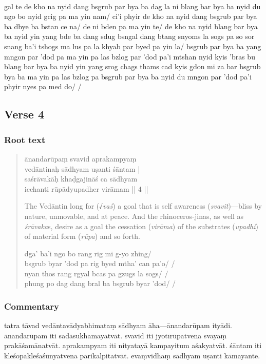 \documentclass[12pt]{article}
\newcommand{\emdash} {\hspace{0em}—\hspace{0em}}
\begin{document}
\textbf{\TVB}\\
gal te de kho na nyid dang bsgrub par bya ba dag la ni blang bar bya ba nyid du ngo bo nyid gcig pa ma yin nam/ ci'i phyir de kho na nyid dang bsgrub par bya ba dbye ba bstan ce na/ de ni bden pa ma yin te/ de kho na nyid blang bar bya ba nyid yin yang bde ba dang sdug bsngal dang btang snyoms la sogs pa so sor snang ba'i tshogs ma lus pa la khyab par byed pa yin la/ bsgrub par bya ba yang mngon par 'dod pa ma yin pa las bzlog par 'dod pa'i mtshan nyid kyis 'bras bu blang bar bya ba nyid yin yang srog chags thams cad kyis gdon mi za bar bsgrub bya ba ma yin pa las bzlog pa bsgrub par bya ba nyid du mngon par 'dod pa'i phyir nyes pa med do/ /

\subsection{Verse 4}
\subsubsection{Root text}
\begin{quote}
	ānandarūpaṃ svavid aprakampyaṃ \\
	vedāntinaḥ sādhyam uṣanti śāntam\footnoteB{
		śāntam] \corr ; sāntam \MS\ \EDD ; \emph{no reflex in} \TIB
	} |\\
	saśrāvakāḥ\footnoteB{
		saśrāvakāḥ] \emd ; saśrāvakā \MS\ \EDD
	} khaḍgajināś ca sādhyam\\
	icchanti rūpādyupadher virāmam || 4 ||

	The Vedāntin long for (√\emph{vaś}) a goal that is self awareness (\emph{svavit})\emdash bliss by nature, unmovable, and at peace. And the rhinoceros-jinas, as well as \emph{śrāvaka}s, desire as a goal the cessation (\emph{virāma}) of the substrates (\emph{upadhi}) of material form (\emph{rūpa}) and so forth.

	dga' ba'i ngo bo rang rig mi g-yo zhing/ \\
	bsgrub byar 'dod pa rig byed mtha' can pa'o/ /\\
	nyan thos rang rgyal bcas pa gzugs la sogs/ /\\
	phung po dag dang bral ba bsgrub byar 'dod/ /
\end{quote}

\subsubsection{Commentary}
tatra tāvad\footnoteB{
	tāvad] \MS\ \EDD\ \TVA\ (re zhig); \emph{no reflex in} \TVB
} vedāntavādyabhimataṃ sādhyam āha\emdash ānandarūpam ityādi.
ānandarūpam iti sadāsukhamayatvāt.
svavid iti jyotīrūpatvena\footnoteB{
	jyotīrūpatvena] \MS ; jyotirūpatvena \EDD
} svayaṃ prakāśamānatvāt.\footnoteB{
	prakāśamānatvāt] \EDD\ (\emd); prakāśamānāt \MS
}
aprakampyam iti nityatayā\footnoteB{
	nityatayā] \EDD ; anityatayā \MS\ \TIB\ (mi rtag pa nyid kyis)
} kampayitum aśakyatvāt.
śāntam\footnoteB{
	śāntam] \corr ; sāntam \MS\ \EDD
} iti kleśopakleśaśūnyatvena parikalpitatvāt.
evaṃvidhaṃ sādhyam uṣanti kāmayante.\\
\end{document}
